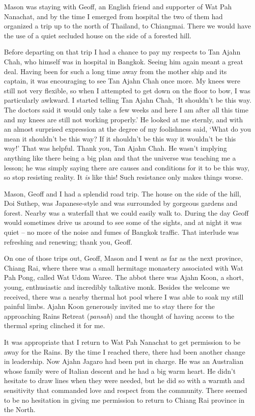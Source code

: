 Mason was staying with Geoff, an English friend and supporter of Wat Pah
Nanachat, and by the time I emerged from hospital the two of them had
organized a trip up to the north of Thailand, to Chiangmai. There we
would have the use of a quiet secluded house on the side of a forested
hill.

Before departing on that trip I had a chance to pay my respects to Tan
Ajahn Chah, who himself was in hospital in Bangkok. Seeing him again
meant a great deal. Having been for such a long time away from the
mother ship and its captain, it was encouraging to see Tan Ajahn Chah
once more. My knees were still not very flexible, so when I attempted to
get down on the floor to bow, I was particularly awkward. I
started telling Tan Ajahn Chah, `It shouldn't be this way. The doctors
said it would only take a few weeks and here I am after all this time
and my knees are still not working properly.' He looked at me sternly,
and with an almost surprised expression at the degree of my foolishness
said, `What do you mean it shouldn't be this way? If it shouldn't be
this way it wouldn't be this way!' That was helpful. Thank you, Tan
Ajahn Chah. He wasn't implying anything like there being a big plan and
that the universe was teaching me a lesson; he was simply saying there
are causes and conditions for it to be this way, so stop resisting
reality. It \emph{is} like this! Such resistance only makes things
worse.

Mason, Geoff and I had a splendid road trip. The house on the side of
the hill, Doi Suthep, was Japanese-style and was surrounded by gorgeous
gardens and forest. Nearby was a waterfall that we could easily walk to.
During the day Geoff would sometimes drive us around to see some of the
sights, and at night it was quiet -- no more of the noise and fumes of
Bangkok traffic. That interlude was refreshing and renewing; thank you,
Geoff.

On one of those trips out, Geoff, Mason and I went as far as the next
province, Chiang Rai, where there was a small hermitage monastery
associated with Wat Pah Pong, called Wat Udom Waree. The abbot
there was Ajahn Koon, a short, young, enthusiastic and incredibly
talkative monk. Besides the welcome we received, there was a nearby
thermal hot pool where I was able to soak my still painful limbs. Ajahn
Koon generously invited me to stay there for the approaching Rains
Retreat (\emph{pansah}) and the thought of having access to the thermal
spring clinched it for me.

It was appropriate that I return to Wat Pah Nanachat to get permission
to be away for the Rains. By the time I reached there, there had been
another change in leadership. Now Ajahn Jagaro had been put in charge.
He was an Australian whose family were of Italian descent and he had a
big warm heart. He didn't hesitate to draw lines when they were needed,
but he did so with a warmth and sensitivity that commanded love and
respect from the community. There seemed to be no hesitation in giving
me permission to return to Chiang Rai province in the North.

